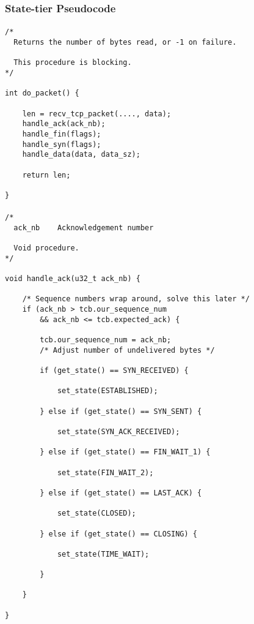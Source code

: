 \documentclass[11pt]{article}
\begin{document}
\subsubsection{State-tier Pseudocode}


\paragraph{}


\begin{lstlisting}[title=Procedure do\_packet]
/*
  Returns the number of bytes read, or -1 on failure.

  This procedure is blocking.
*/

int do_packet() {

    len = recv_tcp_packet(...., data);
    handle_ack(ack_nb);
    handle_fin(flags);
    handle_syn(flags);
    handle_data(data, data_sz);

    return len;

}
\end{lstlisting}


\paragraph{}


\begin{lstlisting}[title=Procedure handle\_ack]
/*
  ack_nb    Acknowledgement number

  Void procedure.
*/

void handle_ack(u32_t ack_nb) {

    /* Sequence numbers wrap around, solve this later */
    if (ack_nb > tcb.our_sequence_num
        && ack_nb <= tcb.expected_ack) {

        tcb.our_sequence_num = ack_nb;
        /* Adjust number of undelivered bytes */

        if (get_state() == SYN_RECEIVED) {

            set_state(ESTABLISHED);

        } else if (get_state() == SYN_SENT) {

            set_state(SYN_ACK_RECEIVED);

        } else if (get_state() == FIN_WAIT_1) {

            set_state(FIN_WAIT_2);

        } else if (get_state() == LAST_ACK) {

            set_state(CLOSED);

        } else if (get_state() == CLOSING) {

            set_state(TIME_WAIT);

        }

    }

}
\end{lstlisting}
\end{document}
